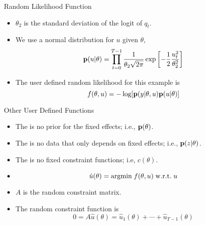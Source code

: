 \documentclass{beamer}
\newcommand{\B}[1]{{\bf #1}}
\newcommand{\R}[1]{{\rm #1}}
\begin{document}
\begin{frame}{Random Likelihood Function}
\begin{itemize}

\item
$\theta_2$ is the standard deviation of the logit of $q_t$.
\pause

\item
We use a normal distribution for $u$ given $\theta$,
\[
\B{p} ( u | \theta )
=
\prod_{t=0}^{T-1}
	\frac{1}{ \theta_2 \sqrt{ 2 \pi } }
		\exp \left[ - \frac{1}{2} \frac{ u_t^2 }{ \theta_2^2 } \right]
\]
\pause

\item
The user defined random likelihood for this example is
\[
f( \theta , u )
=
- \log [ \B{p} ( y | \theta , u) \B{p} ( u | \theta ) ]
\]

\end{itemize}
\end{frame}
\begin{frame}{Other User Defined Functions}
\begin{itemize}

\item
The is no prior for the fixed effects; i.e.,
$\B{p}( \theta )$.
\pause

\item
The is no data that only depends on fixed effects; i.e.,
$\B{p}(z| \theta )$.
\pause

\item
The is no fixed constraint functions; i.e,
$c( \theta )$.
\pause

\item
\[
\hat{u} ( \theta ) = \R{argmin} \; f( \theta , u ) \; \R{w.r.t.} \; u
\]
\pause

\item
$A$ is the random constraint matrix.

\item
The random constraint function is
\[
0
=
A \hat{u} ( \theta )
=
\hat{u}_1 ( \theta ) + \cdots + \hat{u}_{T-1} ( \theta )
\]

\end{itemize}
\end{frame}
\end{document}
